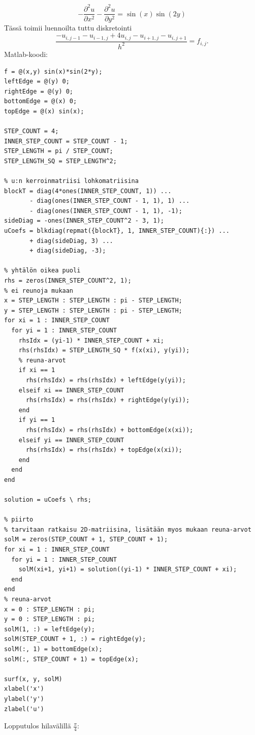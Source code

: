 \documentclass{article}
\begin{document}
\[
  -\frac{\partial^2 u}{\partial x^2} - \frac{\partial^2 u}{\partial y^2} = \sin(x)\sin(2y)
\]
Tässä toimii luennoilta tuttu diskretointi
\[
  \frac{-u_{i,j-1} - u_{i-1,j} + 4u_{i,j} - u_{i+1,j} - u_{i,j+1}}{h^2} = f_{i,j}.
\]
Matlab-koodi:
\begin{verbatim}
f = @(x,y) sin(x)*sin(2*y);
leftEdge = @(y) 0;
rightEdge = @(y) 0;
bottomEdge = @(x) 0;
topEdge = @(x) sin(x);

STEP_COUNT = 4;
INNER_STEP_COUNT = STEP_COUNT - 1;
STEP_LENGTH = pi / STEP_COUNT;
STEP_LENGTH_SQ = STEP_LENGTH^2;

% u:n kerroinmatriisi lohkomatriisina
blockT = diag(4*ones(INNER_STEP_COUNT, 1)) ...
       - diag(ones(INNER_STEP_COUNT - 1, 1), 1) ...
       - diag(ones(INNER_STEP_COUNT - 1, 1), -1);
sideDiag = -ones(INNER_STEP_COUNT^2 - 3, 1);
uCoefs = blkdiag(repmat({blockT}, 1, INNER_STEP_COUNT){:}) ...
       + diag(sideDiag, 3) ...
       + diag(sideDiag, -3);

% yhtälön oikea puoli
rhs = zeros(INNER_STEP_COUNT^2, 1);
% ei reunoja mukaan
x = STEP_LENGTH : STEP_LENGTH : pi - STEP_LENGTH;
y = STEP_LENGTH : STEP_LENGTH : pi - STEP_LENGTH;
for xi = 1 : INNER_STEP_COUNT
  for yi = 1 : INNER_STEP_COUNT
    rhsIdx = (yi-1) * INNER_STEP_COUNT + xi;
    rhs(rhsIdx) = STEP_LENGTH_SQ * f(x(xi), y(yi));
    % reuna-arvot
    if xi == 1
      rhs(rhsIdx) = rhs(rhsIdx) + leftEdge(y(yi));
    elseif xi == INNER_STEP_COUNT
      rhs(rhsIdx) = rhs(rhsIdx) + rightEdge(y(yi));
    end
    if yi == 1
      rhs(rhsIdx) = rhs(rhsIdx) + bottomEdge(x(xi));
    elseif yi == INNER_STEP_COUNT
      rhs(rhsIdx) = rhs(rhsIdx) + topEdge(x(xi));
    end
  end
end

solution = uCoefs \ rhs;

% piirto
% tarvitaan ratkaisu 2D-matriisina, lisätään myos mukaan reuna-arvot
solM = zeros(STEP_COUNT + 1, STEP_COUNT + 1);
for xi = 1 : INNER_STEP_COUNT
  for yi = 1 : INNER_STEP_COUNT
    solM(xi+1, yi+1) = solution((yi-1) * INNER_STEP_COUNT + xi);
  end
end
% reuna-arvot
x = 0 : STEP_LENGTH : pi;
y = 0 : STEP_LENGTH : pi;
solM(1, :) = leftEdge(y);
solM(STEP_COUNT + 1, :) = rightEdge(y);
solM(:, 1) = bottomEdge(x);
solM(:, STEP_COUNT + 1) = topEdge(x);

surf(x, y, solM)
xlabel('x')
ylabel('y')
zlabel('u')

\end{verbatim}

Lopputulos hilavälillä $\frac{\pi}{4}$:
\end{document}
